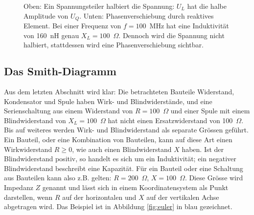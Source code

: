 \documentclass[twoside,a4paper,11pt,halfparskip,DIV=11,notitlepage]{scrartcl}
\begin{document}
\begin{figure}
    \hfill
    \caption{Oben: Ein Spannungsteiler halbiert die Spannung: $U_L$ hat die
    halbe Amplitude von $U_Q$. Unten: Phasenverschiebung durch reaktives Element. Bei
einer Frequenz von $f=100$~MHz hat eine Induktivität von 160~nH genau
$X_L=100$~$\Omega$. Dennoch wird die Spannung nicht halbiert, stattdessen wird eine Phasenverschiebung sichtbar.}
    \label{fig:phasenverschiebung}
\end{figure}

\subsection{Das Smith-Diagramm}\label{sec:smith}
Aus dem letzten Abschnitt wird klar: Die betrachteten Bauteile Widerstand, Kondensator und Spule haben Wirk- und
Blindwiderstände, und eine Serienschaltung aus einem Widerstand von
$R=100$~$\Omega$ und einer Spule mit einem Blindwiderstand von $X_L=100$~$\Omega$ hat nicht einen Ersatzwiderstand
von 100~$\Omega$. Bis auf weiteres werden Wirk- und Blindwiderstand als separate Grössen geführt. Ein Bauteil,
oder eine Kombination von Bauteilen, kann auf diese Art einen Wirkwiderstand
$R\ge0$, wie auch einen Blindwiderstand $X$ haben. Ist der Blindwiderstand positiv, so handelt es sich um ein
Induktivität; ein negativer Blindwiderstand beschreibt eine Kapazität. Für ein Bauteil oder eine Schaltung
aus Bauteilen kann also z.B. gelten: $R=200$~$\Omega$, $X=100$~$\Omega$. Diese Grösse wird Impedanz $Z$ genannt
und lässt sich in einem Koordinatensystem als Punkt darstellen, wenn $R$ auf
der horizontalen und $X$ auf der vertikalen Achse abgetragen wird. Das Beispiel
ist in Abbildung \ref{fig:euler} in  blau gezeichnet. 
\end{document}
